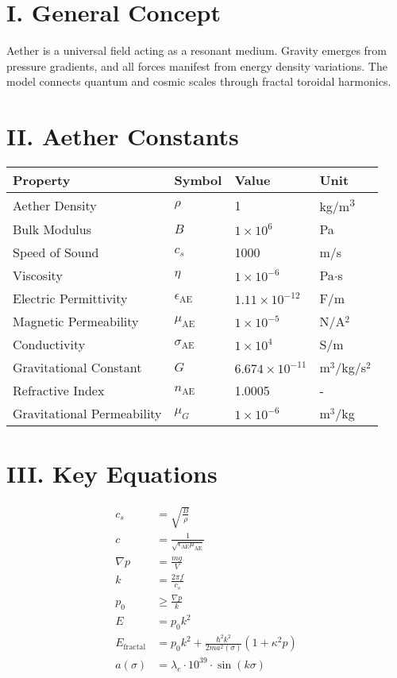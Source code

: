\documentclass[12pt]{book}
\begin{document}
\section*{I. General Concept}
Aether is a universal field acting as a resonant medium. Gravity emerges from pressure gradients, and all forces manifest from energy density variations. The model connects quantum and cosmic scales through fractal toroidal harmonics.

\section*{II. Aether Constants}
\begin{tabular}{|l|l|l|l|}
\hline
\textbf{Property} & \textbf{Symbol} & \textbf{Value} & \textbf{Unit} \\
\hline
Aether Density & $\rho$ & 1 & kg/m\textsuperscript{3} \\
Bulk Modulus & $B$ & $1 \times 10^6$ & Pa \\
Speed of Sound & $c_s$ & 1000 & m/s \\
Viscosity & $\eta$ & $1 \times 10^{-6}$ & Pa$\cdot$s \\
Electric Permittivity & $\epsilon_{\text{AE}}$ & $1.11 \times 10^{-12}$ & F/m \\
Magnetic Permeability & $\mu_{\text{AE}}$ & $1 \times 10^{-5}$ & N/A$^2$ \\
Conductivity & $\sigma_{\text{AE}}$ & $1 \times 10^4$ & S/m \\
Gravitational Constant & $G$ & $6.674 \times 10^{-11}$ & m$^3$/kg/s$^2$ \\
Refractive Index & $n_{\text{AE}}$ & 1.0005 & - \\
Gravitational Permeability & $\mu_G$ & $1 \times 10^{-6}$ & m$^3$/kg \\
\hline
\end{tabular}

\section*{III. Key Equations}
\begin{align*}
c_s &= \sqrt{\frac{B}{\rho}} \\
c &= \frac{1}{\sqrt{\epsilon_{\text{AE}} \mu_{\text{AE}}}} \\
\nabla p &= \frac{mg}{V} \\
k &= \frac{2\pi f}{c_s} \\
p_0 &\geq \frac{\nabla p}{k} \\
E &= p_0 k^2 \\
E_{\text{fractal}} &= p_0 k^2 + \frac{\hbar^2 k^2}{2m a^2(\sigma)} \left(1 + \kappa^2 p\right) \\
a(\sigma) &= \lambda_e \cdot 10^{39} \cdot \sin(k\sigma)
\end{align*}
\end{document}
